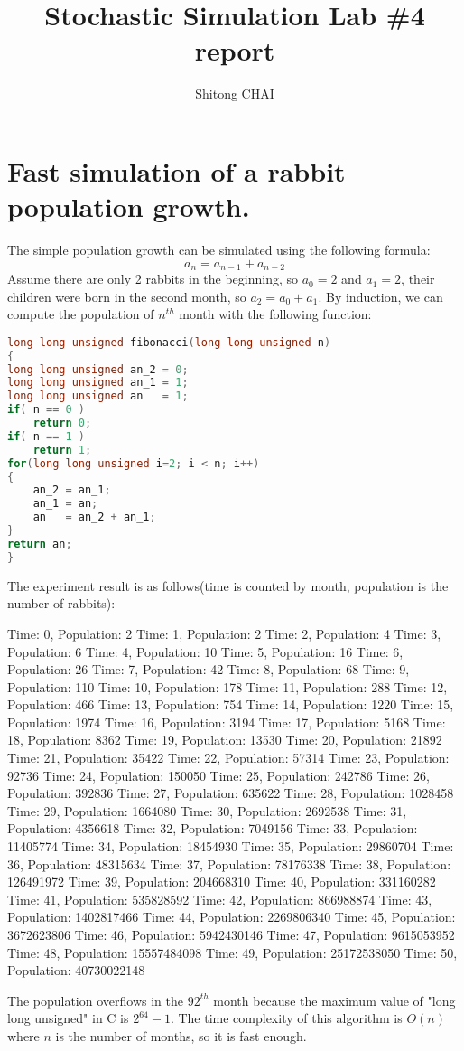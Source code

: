 \documentclass{article}
\title{Stochastic Simulation Lab \#4 report}
\author{Shitong CHAI}
\date{}
\begin{document}
\maketitle 

    \section{Fast simulation of a rabbit population growth.}
    
    The simple population growth can be simulated using the following formula:
    $$ a_n = a_{n-1} + a_{n-2} $$
    Assume there are only 2 rabbits in the beginning, so $a_0 = 2$ and $ a_1 = 2$, their children were born in the second month, so $a_2=a_0+a_1$. By induction, we can compute the population of $n^{th}$ month with the following function:
    \begin{lstlisting}[language=C]
long long unsigned fibonacci(long long unsigned n)
{
long long unsigned an_2 = 0;
long long unsigned an_1 = 1;
long long unsigned an   = 1;
if( n == 0 )
    return 0;
if( n == 1 )
    return 1;
for(long long unsigned i=2; i < n; i++)
{
    an_2 = an_1;
    an_1 = an;
    an   = an_2 + an_1;
}
return an;
}
    \end{lstlisting}
    The experiment result is as follows(time is counted by month, population is the number of rabbits):
    \begin{messageshell}
Time: 0, Population: 2
Time: 1, Population: 2
Time: 2, Population: 4
Time: 3, Population: 6
Time: 4, Population: 10
Time: 5, Population: 16
Time: 6, Population: 26
Time: 7, Population: 42
Time: 8, Population: 68
Time: 9, Population: 110
Time: 10, Population: 178
Time: 11, Population: 288
Time: 12, Population: 466
Time: 13, Population: 754
Time: 14, Population: 1220
Time: 15, Population: 1974
Time: 16, Population: 3194
Time: 17, Population: 5168
Time: 18, Population: 8362
Time: 19, Population: 13530
Time: 20, Population: 21892
Time: 21, Population: 35422
Time: 22, Population: 57314
Time: 23, Population: 92736
Time: 24, Population: 150050
Time: 25, Population: 242786
Time: 26, Population: 392836
Time: 27, Population: 635622
Time: 28, Population: 1028458
Time: 29, Population: 1664080
Time: 30, Population: 2692538
Time: 31, Population: 4356618
Time: 32, Population: 7049156
Time: 33, Population: 11405774
Time: 34, Population: 18454930
Time: 35, Population: 29860704
Time: 36, Population: 48315634
Time: 37, Population: 78176338
Time: 38, Population: 126491972
Time: 39, Population: 204668310
Time: 40, Population: 331160282
Time: 41, Population: 535828592
Time: 42, Population: 866988874
Time: 43, Population: 1402817466
Time: 44, Population: 2269806340
Time: 45, Population: 3672623806
Time: 46, Population: 5942430146
Time: 47, Population: 9615053952
Time: 48, Population: 15557484098
Time: 49, Population: 25172538050
Time: 50, Population: 40730022148
    \end{messageshell}
    The population overflows in the $92^{th}$ month because the maximum value of "long long unsigned" in C is $2^{64}-1$.
    The time complexity of this algorithm is $O(n)$ where $n$ is the number of months, so it is fast enough.
    
\end{document}
